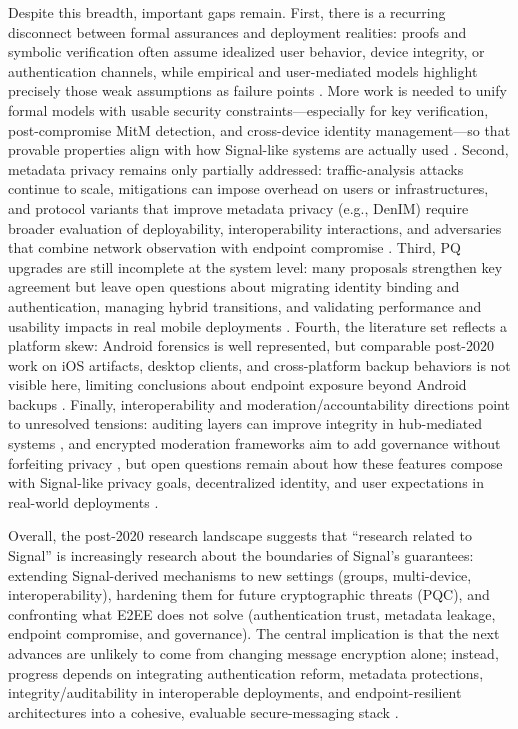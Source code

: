 Despite this breadth, important gaps remain. First, there is a recurring disconnect between formal assurances and deployment realities: proofs and symbolic verification often assume idealized user behavior, device integrity, or authentication channels, while empirical and user-mediated models highlight precisely those weak assumptions as failure points \cite{kamkuemah2021,dowling2021,basem2023}. More work is needed to unify formal models with usable security constraints—especially for key verification, post-compromise MitM detection, and cross-device identity management—so that provable properties align with how Signal-like systems are actually used \cite{dowling2021,basem2023}. Second, metadata privacy remains only partially addressed: traffic-analysis attacks continue to scale, mitigations can impose overhead on users or infrastructures, and protocol variants that improve metadata privacy (e.g., DenIM) require broader evaluation of deployability, interoperability interactions, and adversaries that combine network observation with endpoint compromise \cite{bozorgi2023,brigham2025,nelson2024}. Third, PQ upgrades are still incomplete at the system level: many proposals strengthen key agreement but leave open questions about migrating identity binding and authentication, managing hybrid transitions, and validating performance and usability impacts in real mobile deployments \cite{angom2025,sharma2023,boras2025}. Fourth, the literature set reflects a platform skew: Android forensics is well represented, but comparable post-2020 work on iOS artifacts, desktop clients, and cross-platform backup behaviors is not visible here, limiting conclusions about endpoint exposure beyond Android backups \cite{krishnapriya2021}. Finally, interoperability and moderation/accountability directions point to unresolved tensions: auditing layers can improve integrity in hub-mediated systems \cite{sarvaiya2025}, and encrypted moderation frameworks aim to add governance without forfeiting privacy \cite{jiang2024}, but open questions remain about how these features compose with Signal-like privacy goals, decentralized identity, and user expectations in real-world deployments \cite{jiang2024,morales2024,sarvaiya2025}.

Overall, the post-2020 research landscape suggests that “research related to Signal” is increasingly research about the boundaries of Signal’s guarantees: extending Signal-derived mechanisms to new settings (groups, multi-device, interoperability), hardening them for future cryptographic threats (PQC), and confronting what E2EE does not solve (authentication trust, metadata leakage, endpoint compromise, and governance). The central implication is that the next advances are unlikely to come from changing message encryption alone; instead, progress depends on integrating authentication reform, metadata protections, integrity/auditability in interoperable deployments, and endpoint-resilient architectures into a cohesive, evaluable secure-messaging stack \cite{dowling2021,morales2024,brigham2025,sarvaiya2025,alsop2025,r2025}.

\printbibliography

